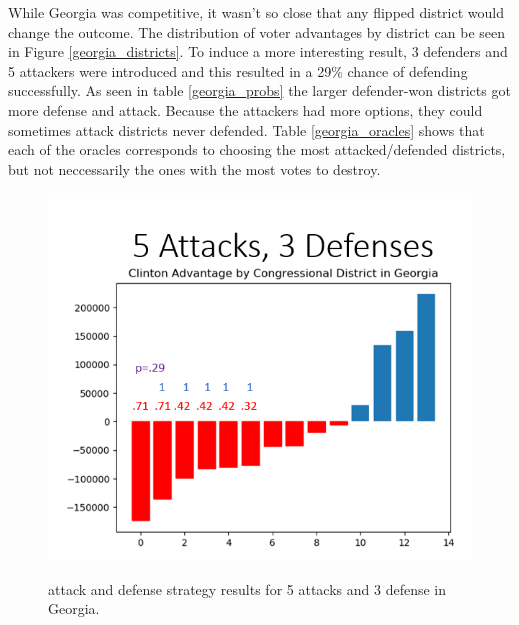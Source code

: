 \documentclass[letterpaper]{article} %
\begin{document}
While Georgia was competitive, it wasn't so close that any flipped district would change the outcome. The distribution of voter advantages by district can be seen in Figure \ref{georgia_districts}. To induce a more interesting result, 3 defenders and 5 attackers were introduced and this resulted in a 29\% chance of defending successfully. As seen in table \ref{georgia_probs} the larger defender-won districts got more defense and attack. Because the attackers had more options, they could sometimes attack districts never defended. Table \ref{georgia_oracles} shows that each of the oracles corresponds to choosing the most attacked/defended districts, but not neccessarily the ones with the most votes to destroy. 



\begin{figure}
    \includegraphics[width=\linewidth]{5and3}
    \label{5and3}
 \caption{attack and defense strategy results for 5 attacks and 3 defense in Georgia.}
\end{figure}
\end{document}
